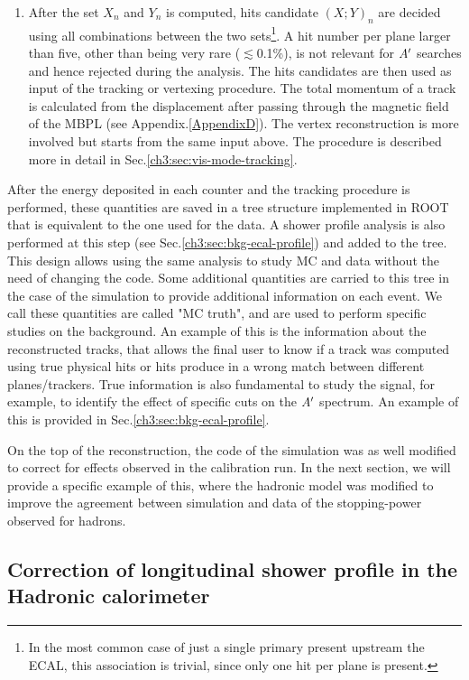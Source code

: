 \begin{enumerate}
\item After the set $X_n$ and $Y_n$ is computed, hits candidate $(X;Y)_n$ are decided using all combinations between the two sets\footnote{In the most common case of just a single primary present upstream the ECAL, this association is trivial, since only one hit per plane is present.}. A hit number per plane larger than five, other than being very rare ($\lesssim$0.1\%), is not relevant for $A'$ searches and hence rejected during the analysis. The hits candidates are then used as input of the tracking or vertexing procedure. The total momentum of a track is calculated from the displacement after passing through the magnetic field of the MBPL (see Appendix.\ref{AppendixD}). The vertex reconstruction is more involved but starts from the same input above. The procedure is described more in detail in Sec.\ref{ch3:sec:vis-mode-tracking}.
\end{enumerate}

After the energy deposited in each counter and the tracking procedure is performed, these quantities are saved in a tree structure implemented in ROOT \cite{root} that is equivalent to the one used for the data. A shower profile analysis is also performed at this step (see Sec.\ref{ch3:sec:bkg-ecal-profile}) and added to the tree. This design allows using the same analysis to study MC and data without the need of changing the code. Some additional quantities are carried to this tree in the case of the simulation to provide additional information on each event. We call these quantities are called "MC truth", and are used to perform specific studies on the background. An example of this is the information about the reconstructed tracks, that allows the final user to know if a track was computed using true physical hits or hits produce in a wrong match between different planes/trackers. True information is also fundamental to study the signal, for example, to identify the effect of specific cuts on the $A'$ spectrum. An example of this is provided in Sec.\ref{ch3:sec:bkg-ecal-profile}.

On the top of the reconstruction, the code of the simulation was as well modified to correct for effects observed in the calibration run. In the next section, we will provide a specific example of this, where the hadronic model was modified to improve the agreement between simulation and data of the stopping-power observed for hadrons.

\subsection{Correction of longitudinal shower profile in the Hadronic calorimeter}
\label{ch3:sec:geant4-hcal-corr}


